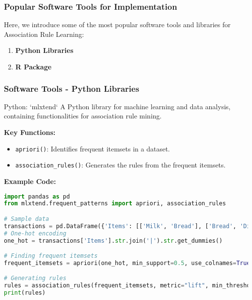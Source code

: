 \documentclass[aspectratio=169]{beamer}
\begin{document}
\begin{frame}
    \frametitle{Popular Software Tools for Implementation}
    Here, we introduce some of the most popular software tools and libraries for Association Rule Learning:
    
    \begin{enumerate}
        \item \textbf{Python Libraries}
        \item \textbf{R Package}
    \end{enumerate}
\end{frame}

\begin{frame}[fragile]
    \frametitle{Software Tools - Python Libraries}
    \begin{block}{Python: `mlxtend`}
        A Python library for machine learning and data analysis, containing functionalities for association rule mining.
        
        \textbf{Key Functions:}
        \begin{itemize}
            \item \texttt{apriori()}: Identifies frequent itemsets in a dataset.
            \item \texttt{association\_rules()}: Generates the rules from the frequent itemsets.
        \end{itemize}
        
        \textbf{Example Code:}
        \begin{lstlisting}[language=Python]
import pandas as pd
from mlxtend.frequent_patterns import apriori, association_rules

# Sample data
transactions = pd.DataFrame({'Items': [['Milk', 'Bread'], ['Bread', 'Diaper'], ['Milk', 'Diaper', 'Bread'], ['Diaper']]})
# One-hot encoding
one_hot = transactions['Items'].str.join('|').str.get_dummies()

# Finding frequent itemsets
frequent_itemsets = apriori(one_hot, min_support=0.5, use_colnames=True)

# Generating rules
rules = association_rules(frequent_itemsets, metric="lift", min_threshold=1)
print(rules)
        \end{lstlisting}
    \end{block}
\end{frame}
\end{document}
